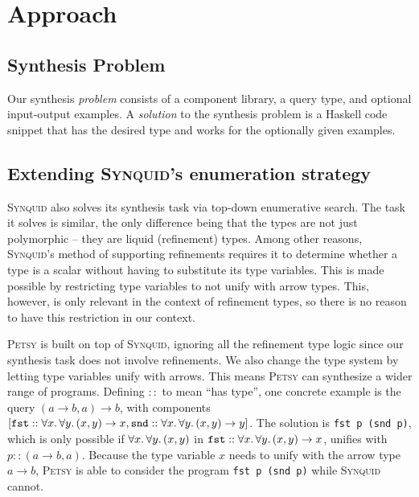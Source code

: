 \documentclass[acmsmall,nonacm]{acmart}
\begin{document}
\section{Approach}
\label{approach}



\subsection{Synthesis Problem}

Our synthesis \textit{problem} consists of a component library, a query type,
and optional input-output examples. A \textit{solution} to the synthesis 
problem is a Haskell code snippet that has the desired type and works 
for the optionally given examples.

\subsection{Extending \textsc{Synquid}'s enumeration strategy} 


\textsc{Synquid} also solves its synthesis task via top-down enumerative search.
The task it solves is similar, the only difference being that the types are
not just polymorphic -- they are liquid (refinement) types. Among other
reasons, \textsc{Synquid}'s method of supporting refinements requires it to
determine whether a type is a scalar without having to substitute its type
variables. This is made possible by restricting type variables to not unify
with arrow types. This, however, is only relevant in the context of refinement types, 
so there is no reason to have this restriction in our context. 


\textsc{Petsy} is built on top of \textsc{Synquid}, ignoring all the refinement
type logic since our synthesis task does not involve refinements. We also
change the type system by letting type variables unify with arrows.
This means \textsc{Petsy} can synthesize a wider range of programs.
Defining $::$ to mean ``has type'', one
concrete example is the query $(a \to b, a) \to b$, with components
$[\texttt{fst} :: \forall x\ldotp\forall y\ldotp (x,y)\to x, \texttt{snd} :: \forall x\ldotp\forall y\ldotp (x,y)\to y]$. The solution is \texttt{fst p
(snd p)}, which is only possible if $\forall x\ldotp\forall y\ldotp (x,y)$ in
$\texttt{fst} :: \forall x\ldotp\forall y\ldotp (x,y)\to x$,
unifies with $p :: (a \to b, a)$. Because the type variable $x$ needs to unify
with the arrow type $a \to b$, \textsc{Petsy} is able to consider the program
\texttt{fst p (snd p)} while \textsc{Synquid} cannot.
\end{document}
